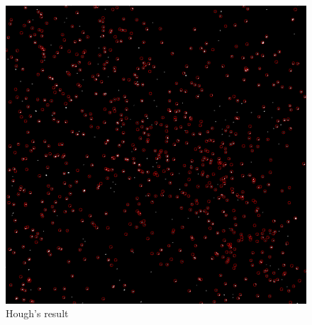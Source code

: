 \begin{figure}
	\centerline{\includegraphics[width=\locateimgsize]{images/locate/hough-transform.png}}
	\caption{\centering Hough's result}
	\label{fig:locate:hough}
\end{figure}
